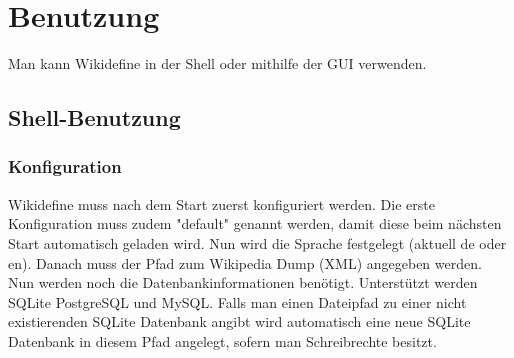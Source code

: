 \documentclass[12pt]{article}
\begin{document}
\section{Benutzung}
Man kann Wikidefine in der Shell oder mithilfe der GUI verwenden.

\subsection{Shell-Benutzung}
\subsubsection{Konfiguration}
Wikidefine muss nach dem Start zuerst konfiguriert werden. Die erste Konfiguration muss zudem "default" genannt werden, damit diese beim n\"achsten Start automatisch geladen wird. Nun wird die Sprache festgelegt (aktuell de oder en). Danach muss der Pfad zum Wikipedia Dump (XML) angegeben werden. Nun werden noch die Datenbankinformationen ben\"otigt. Unterst\"utzt werden SQLite PostgreSQL und MySQL. Falls man einen Dateipfad zu einer nicht existierenden SQLite Datenbank angibt wird automatisch eine neue SQLite Datenbank in diesem Pfad angelegt, sofern man Schreibrechte besitzt.
\end{document}
